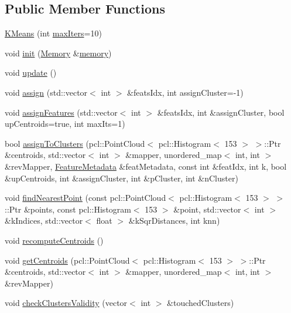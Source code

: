 \subsection*{Public Member Functions}
\begin{DoxyCompactItemize}
\item 
\hyperlink{class_k_means_aa5756bdbeb9251ceb6ee216750f03768}{K\+Means} (int \hyperlink{class_k_means_a605becae019372330541541fec4ecfe5}{max\+Iters}=10)
\item 
void \hyperlink{class_k_means_ac3cd603b2f690e166fb860d5869280e4}{init} (\hyperlink{class_memory}{Memory} \&\hyperlink{class_k_means_af11af5cfa79ac50307a580839d36deef}{memory})
\item 
void \hyperlink{class_k_means_a464d883306ac4e2651eb435207d7b9f5}{update} ()
\item 
void \hyperlink{class_k_means_a8ca0d91448c1e9768808c21fee341e11}{assign} (std\+::vector$<$ int $>$ \&feats\+Idx, int assign\+Cluster=-\/1)
\item 
void \hyperlink{class_k_means_a24391c53c50d73c3c7bab0dabacaeca7}{assign\+Features} (std\+::vector$<$ int $>$ \&feats\+Idx, int \&assign\+Cluster, bool up\+Centroids=true, int max\+Its=1)
\item 
bool \hyperlink{class_k_means_a7aeb5bd10c7faf177955cafab9e55281}{assign\+To\+Clusters} (pcl\+::\+Point\+Cloud$<$ pcl\+::\+Histogram$<$ 153 $>$ $>$\+::Ptr \&centroids, std\+::vector$<$ int $>$ \&mapper, unordered\+\_\+map$<$ int, int $>$ \&rev\+Mapper, \hyperlink{class_feature_metadata}{Feature\+Metadata} \&feat\+Metadata, const int \&feat\+Idx, int k, bool \&up\+Centroids, int \&assign\+Cluster, int \&p\+Cluster, int \&n\+Cluster)
\item 
void \hyperlink{class_k_means_a3da2ed78f2e7b11c67e405fccdda86b7}{find\+Nearest\+Point} (const pcl\+::\+Point\+Cloud$<$ pcl\+::\+Histogram$<$ 153 $>$ $>$\+::Ptr \&points, const pcl\+::\+Histogram$<$ 153 $>$ \&point, std\+::vector$<$ int $>$ \&k\+Indices, std\+::vector$<$ float $>$ \&k\+Sqr\+Distances, int knn)
\item 
void \hyperlink{class_k_means_ad798e3546155a9f694a4be22331e25e7}{recompute\+Centroids} ()
\item 
void \hyperlink{class_k_means_ad4598c662956fc8b224a287f0c2c9ea0}{get\+Centroids} (pcl\+::\+Point\+Cloud$<$ pcl\+::\+Histogram$<$ 153 $>$ $>$\+::Ptr \&centroids, std\+::vector$<$ int $>$ \&mapper, unordered\+\_\+map$<$ int, int $>$ \&rev\+Mapper)
\item 
void \hyperlink{class_k_means_af8f2b01669d61b4093de2854cfe0a935}{check\+Clusters\+Validity} (vector$<$ int $>$ \&touched\+Clusters)

\end{DoxyCompactItemize}
